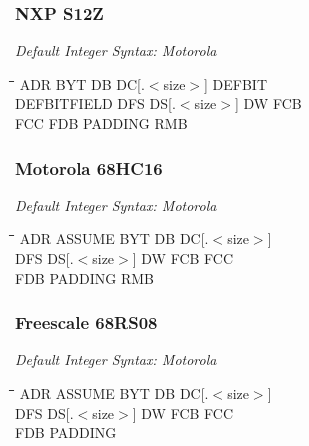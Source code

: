 \subsubsection{NXP S12Z}

{\em Default Integer Syntax: Motorola}

{\tt\begin{tabbing}
\hspace{3cm}\=\hspace{3cm}\=\hspace{3cm}\=\hspace{3cm}\=\kill
ADR        \> BYT         \> DB          \> DC[.$<$size$>$] \> DEFBIT \\
DEFBITFIELD \> DFS        \> DS[.$<$size$>$] \> DW          \> FCB \\
FCC     \> FDB \> PADDING \> RMB \\
\end{tabbing}}

\subsubsection{Motorola 68HC16}

{\em Default Integer Syntax: Motorola}

{\tt\begin{tabbing}
\hspace{3cm}\=\hspace{3cm}\=\hspace{3cm}\=\hspace{3cm}\=\kill
ADR        \> ASSUME      \> BYT         \> DB          \> DC[.$<$size$>$] \\
DFS        \> DS[.$<$size$>$] \> DW      \> FCB         \> FCC \\
FDB         \> PADDING    \> RMB \\
\end{tabbing}}

\subsubsection{Freescale 68RS08}

{\em Default Integer Syntax: Motorola}

{\tt\begin{tabbing}
\hspace{3cm}\=\hspace{3cm}\=\hspace{3cm}\=\hspace{3cm}\=\kill
ADR        \> ASSUME      \> BYT         \> DB          \> DC[.$<$size$>$] \\
DFS        \> DS[.$<$size$>$] \> DW      \> FCB         \> FCC \\
FDB         \> PADDING \\
\end{tabbing}}

